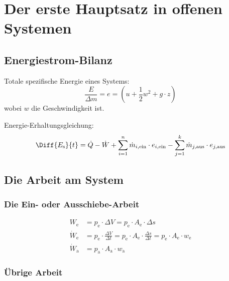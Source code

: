 
\section{Der erste Hauptsatz in offenen Systemen} %
	
	\subsection{Energiestrom-Bilanz} %
		
		Totale spezifische Energie eines Systems:
		\[
			\frac{E}{\Delta m} = e = (u+\frac{1}{2}w^2+g\cdot z)
		\]
		wobei $w$ die Geschwindigkeit ist.
		
		Energie-Erhaltungsgleichung:
		\[
			\Diff{E_{\text{s}}}{t} = \dot{Q} - \dot{W} + \sum_{i=1}^{n} \dot{m}_{i,\text{ein}} \cdot e_{i,\text{ein}} - \sum_{j=1}^k \dot{m}_{j,\text{aus}} \cdot e_{j,\text{aus}}
		\]
		
	
	\subsection{Die Arbeit am System} %
		
		\subsubsection{Die Ein- oder Ausschiebe-Arbeit} %
			
			\begin{align*}
				W_{\text{e}} &= p_{\text{e}} \cdot \Delta V = p_{\text{e}} \cdot A_{\text{e}} \cdot \Delta s \\
				\dot W_{\text{e}} &= p_{\text{e}} \cdot \frac{\Delta V}{\Delta t} = p_{\text{e}} \cdot A_{\text{e}} \cdot \frac{\Delta s}{\Delta t} = p_{\text{e}} \cdot A_{\text{e}} \cdot w_{\text{e}} \\
				\dot W_{\text{a}} &= p_{\text{a}} \cdot A_{\text{a}} \cdot w_{\text{a}}
			\end{align*}
			
		
		\subsubsection{Übrige Arbeit} %
			
